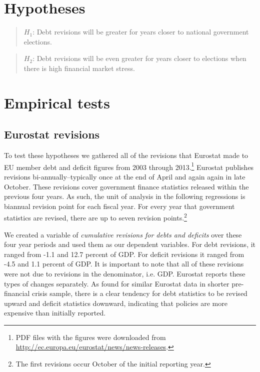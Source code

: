 \documentclass[]{article}
\begin{document}
\section{Hypotheses}

\begin{quote}
    $H_{1}$: Debt revisions will be greater for years closer to national government elections.
\end{quote}

\begin{quote}
    $H_{2}$: Debt revisions will be even greater for years closer to elections when there is high financial market stress.
\end{quote}

\section{Empirical tests}

\subsection{Eurostat revisions}

To test these hypotheses we gathered all of the revisions that Eurostat made to EU member debt and deficit figures from 2003 through 2013.\footnote{PDF files with the figures were downloaded from \url{http://ec.europa.eu/eurostat/news/news-releases}.} Eurostat publishes revisions bi-annually--typically once at the end of April and again again in late October. These revisions cover government finance statistics released within the previous four years. As such, the unit of analysis in the following regressions is biannual revision point for each fiscal year. For every year that government statistics are revised, there are up to seven revision points.\footnote{The first revisions occur October of the initial reporting year.}

We created a variable of \emph{cumulative revisions for debts and deficits} over these four year periods and used them as our dependent variables. For debt revisions, it ranged from -1.1 and 12.7 percent of GDP. For deficit revisions it ranged from -4.5 and 1.1 percent of GDP. It is important to note that all of these revisions were not due to revisions in the denominator, i.e. GDP. Eurostat reports these types of changes separately. As \cite{DeCastro2013} found for similar Eurostat data in shorter pre-financial crisis sample, there is a clear tendency for debt statistics to be revised upward and deficit statistics downward, indicating that policies are more expensive than initially reported.
\end{document}
